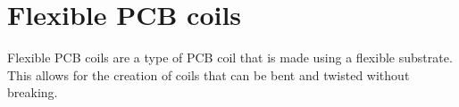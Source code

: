 \section{Flexible PCB coils}
Flexible PCB coils are a type of PCB coil that is made using a flexible substrate. This allows for the creation of coils that can be bent and twisted without breaking.






